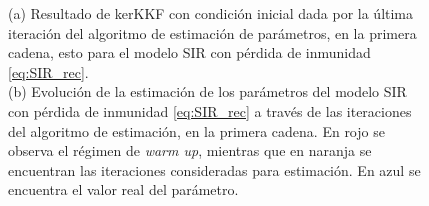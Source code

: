 \begin{figure}[h]
\begin{subfigure}[b]{0.49\textwidth}
         \caption{}
         \label{fig:nonlinear_filters_sir_rec_params_evolution}
    \end{subfigure}
    \caption{(a) Resultado de kerKKF con condición inicial dada por la última iteración del algoritmo de estimación de parámetros, en la primera cadena, esto para el modelo SIR con pérdida de inmunidad \eqref{eq:SIR_rec}.\\
    (b) Evolución de la estimación de los parámetros del modelo SIR con pérdida de inmunidad \eqref{eq:SIR_rec} a través de las iteraciones del algoritmo de estimación, en la primera cadena. En rojo se observa el régimen de \textit{warm up}, mientras que en naranja se encuentran las iteraciones consideradas para estimación. En azul se encuentra el valor real del parámetro.}
    \label{fig:SIR_inmun}
\end{figure}

